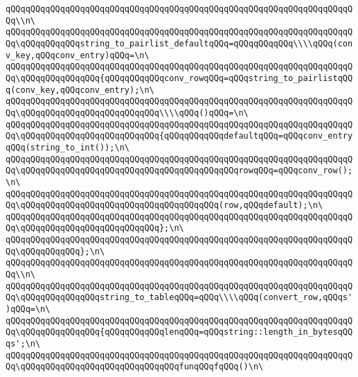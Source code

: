 \verb|qQQqqQQqqQQqqQQqqQQqqQQqqQQqqQQqqQQqqQQqqQQqqQQqqQQqqQQqqQQqqQQqqQQqqQQq\\n\|\newline
\verb|qQQqqQQqqQQqqQQqqQQqqQQqqQQqqQQqqQQqqQQqqQQqqQQqqQQqqQQqqQQqqQQqqQQqqQQq\qQQqqQQqqQQqstring_to_pairlist_defaultqQQq=qQQqqQQqqQQq\\\\qQQq(conv_key,qQQqconv_entry)qQQq=\n\|\newline
\verb|qQQqqQQqqQQqqQQqqQQqqQQqqQQqqQQqqQQqqQQqqQQqqQQqqQQqqQQqqQQqqQQqqQQqqQQq\qQQqqQQqqQQqqQQq{qQQqqQQqqQQqconv_rowqQQq=qQQqstring_to_pairlistqQQq(conv_key,qQQqconv_entry);\n\|\newline
\verb|qQQqqQQqqQQqqQQqqQQqqQQqqQQqqQQqqQQqqQQqqQQqqQQqqQQqqQQqqQQqqQQqqQQqqQQq\qQQqqQQqqQQqqQQqqQQqqQQqqQQq\\\\qQQq()qQQq=\n\|\newline
\verb|qQQqqQQqqQQqqQQqqQQqqQQqqQQqqQQqqQQqqQQqqQQqqQQqqQQqqQQqqQQqqQQqqQQqqQQq\qQQqqQQqqQQqqQQqqQQqqQQqqQQq{qQQqqQQqqQQqdefaultqQQq=qQQqconv_entryqQQq(string_to_int());\n\|\newline
\verb|qQQqqQQqqQQqqQQqqQQqqQQqqQQqqQQqqQQqqQQqqQQqqQQqqQQqqQQqqQQqqQQqqQQqqQQq\qQQqqQQqqQQqqQQqqQQqqQQqqQQqqQQqqQQqqQQqqQQqrowqQQq=qQQqconv_row();\n\|\newline
\verb|qQQqqQQqqQQqqQQqqQQqqQQqqQQqqQQqqQQqqQQqqQQqqQQqqQQqqQQqqQQqqQQqqQQqqQQq\qQQqqQQqqQQqqQQqqQQqqQQqqQQqqQQqqQQqqQQq(row,qQQqdefault);\n\|\newline
\verb|qQQqqQQqqQQqqQQqqQQqqQQqqQQqqQQqqQQqqQQqqQQqqQQqqQQqqQQqqQQqqQQqqQQqqQQq\qQQqqQQqqQQqqQQqqQQqqQQqqQQq};\n\|\newline
\verb|qQQqqQQqqQQqqQQqqQQqqQQqqQQqqQQqqQQqqQQqqQQqqQQqqQQqqQQqqQQqqQQqqQQqqQQq\qQQqqQQqqQQq};\n\|\newline
\verb|qQQqqQQqqQQqqQQqqQQqqQQqqQQqqQQqqQQqqQQqqQQqqQQqqQQqqQQqqQQqqQQqqQQqqQQq\\n\|\newline
\verb|qQQqqQQqqQQqqQQqqQQqqQQqqQQqqQQqqQQqqQQqqQQqqQQqqQQqqQQqqQQqqQQqqQQqqQQq\qQQqqQQqqQQqqQQqstring_to_tableqQQq=qQQq\\\\qQQq(convert_row,qQQqs')qQQq=\n\|\newline
\verb|qQQqqQQqqQQqqQQqqQQqqQQqqQQqqQQqqQQqqQQqqQQqqQQqqQQqqQQqqQQqqQQqqQQqqQQq\qQQqqQQqqQQqqQQq{qQQqqQQqqQQqlenqQQq=qQQqstring::length_in_bytesqQQqs';\n\|\newline
\verb|qQQqqQQqqQQqqQQqqQQqqQQqqQQqqQQqqQQqqQQqqQQqqQQqqQQqqQQqqQQqqQQqqQQqqQQq\qQQqqQQqqQQqqQQqqQQqqQQqqQQqqQQqfunqQQqfqQQq()\n\|\newline
